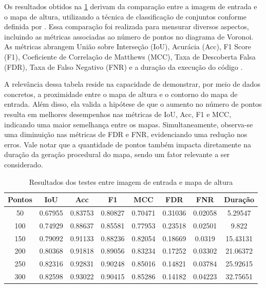 Os resultados obtidos na \cref{tab:final_input_output_3d} derivam da comparação entre a imagem de entrada e o mapa de altura, utilizando a técnica de classificação de conjuntos conforme definida por \cite{kirillov2019panoptic}. Essa comparação foi realizada para mensurar diversos aspectos, incluindo as métricas associadas ao número de pontos no diagrama de Voronoi. As métricas abrangem União sobre Interseção (IoU), Acurácia (Acc), F1 Score (F1), Coeficiente de Correlação de Matthews (MCC), Taxa de Descoberta Falsa (FDR), Taxa de Falso Negativo (FNR) e a duração da execução do código \cite{Chicco2020, confusion_matrix_calculator, iou_metric_link}.

A relevância dessa tabela reside na capacidade de demonstrar, por meio de dados concretos, a proximidade entre o mapa de altura e o contorno do mapa de entrada. Além disso, ela valida a hipótese de que o aumento no número de pontos resulta em melhores desempenhos nas métricas de IoU, Acc, F1 e MCC, indicando uma maior semelhança entre os mapas. Simultaneamente, observa-se uma diminuição nas métricas de FDR e FNR, evidenciando uma redução nos erros. Vale notar que a quantidade de pontos também impacta diretamente na duração da geração procedural do mapa, sendo um fator relevante a ser considerado.


\begin{table}[h]
	\centering
	\caption{Resultados dos testes entre imagem de entrada e mapa de altura}
	\label{tab:final_input_output_3d}
	\begin{tabular}{|c|c|c|c|c|c|c|c|}
		\hline
						Pontos & IoU & Acc & F1 & MCC & FDR & FNR & Duração \\
		\hline
		50 & 0.67955 & 0.83753 & 0.80827 & 0.70471 & 0.31036 & 0.02058 & 5.29547\\
100 & 0.74929 & 0.88637 & 0.85581 & 0.77953 & 0.23518 & 0.02501 & 9.822\\
150 & 0.79092 & 0.91133 & 0.88236 & 0.82054 & 0.18669 & 0.0319 & 15.43131\\
200 & 0.80368 & 0.91818 & 0.89056 & 0.83234 & 0.17252 & 0.03302 & 21.06372\\
250 & 0.82316 & 0.92831 & 0.90248 & 0.85016 & 0.14821 & 0.03784 & 25.92615\\
300 & 0.82598 & 0.93022 & 0.90415 & 0.85286 & 0.14182 & 0.04223 & 32.75651\\
		\hline
	\end{tabular}
\end{table}

